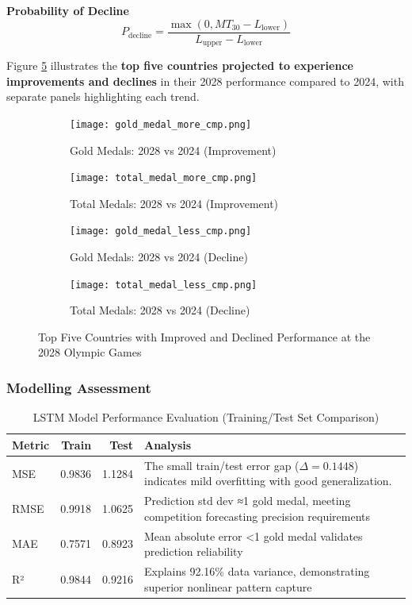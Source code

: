 \documentclass{mcmthesis}
\begin{document}
\textbf{Probability of Decline} 
\[
P_{\text{decline}} = \frac{\max(0, MT_{30} - L_{\text{lower}})}{L_{\text{upper}} - L_{\text{lower}}}
\]

Figure \ref{fig:medal_comparison_combined} illustrates the \textbf{top five countries projected to experience improvements and declines} in their 2028 performance compared to 2024, with separate panels highlighting each trend.

\begin{figure}[H]
	\centering
	\begin{subfigure}[b]{0.45\textwidth}
		\texttt{[image: gold\_medal\_more\_cmp.png]}
		\caption{Gold Medals: 2028 vs 2024 (Improvement)}
		\label{fig:gold_medal}
	\end{subfigure}
	\hfill
	\begin{subfigure}[b]{0.45\textwidth}
		\texttt{[image: total\_medal\_more\_cmp.png]}
		\caption{Total Medals: 2028 vs 2024 (Improvement)}
		\label{fig:total_medal}
	\end{subfigure}
	\vspace{0.5cm}
	\begin{subfigure}[b]{0.45\textwidth}
		\texttt{[image: gold\_medal\_less\_cmp.png]}
		\caption{Gold Medals: 2028 vs 2024 (Decline)}
		\label{fig:gold_medal1}
	\end{subfigure}
	\hfill
	\begin{subfigure}[b]{0.45\textwidth}
		\texttt{[image: total\_medal\_less\_cmp.png]}
		\caption{Total Medals: 2028 vs 2024 (Decline)}
		\label{fig:total_medal1}
	\end{subfigure}
	\caption{Top Five Countries with Improved and Declined Performance at the 2028 Olympic Games}
	\label{fig:medal_comparison_combined}
\end{figure}

\subsubsection{Modelling Assessment}

\begin{table}[H]
	\centering
	\caption{LSTM Model Performance Evaluation (Training/Test Set Comparison)}
	\label{tab:model_performance}
	\begin{tabular}{lrrp{9cm}}
		\toprule
		\rowcolor{red!10}
		\textbf{Metric} & \textbf{Train} & \textbf{Test} & \textbf{Analysis} \\
		\midrule
		\rowcolor{gray!10}
		MSE  & 0.9836 & 1.1284 & The small train/test error gap (\(\Delta = 0.1448\)) indicates mild overfitting with good generalization.\\
		RMSE & 0.9918 & 1.0625 & Prediction std dev ≈1 gold medal, meeting competition forecasting precision requirements \\
		\rowcolor{gray!10}
		MAE  & 0.7571 & 0.8923 & Mean absolute error <1 gold medal validates prediction reliability \\
		R²   & 0.9844 & 0.9216 & Explains 92.16\% data variance, demonstrating superior nonlinear pattern capture \\
		\bottomrule
	\end{tabular}
\end{table}
\end{document}
